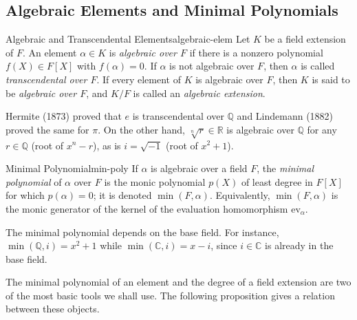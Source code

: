 \subsection{Algebraic Elements and Minimal Polynomials}

\begin{Definition}{Algebraic and Transcendental Elements}{algebraic-elem}
  Let $K$ be a field extension of $F$. 
  An element $\alpha\in K$ is \emph{algebraic over $F$} if there is a nonzero polynomial $f(X)\in F[X]$ with $f(\alpha)=0$. 
  If $\alpha$ is not algebraic over $F$, then $\alpha$ is called \emph{transcendental over $F$}. 
  If every element of $K$ is algebraic over $F$, then $K$ is said to be \emph{algebraic over $F$}, and $K/F$ is called an \emph{algebraic extension}.
\end{Definition}

Hermite (1873) proved that $e$ is transcendental over $\mathbb{Q}$ and Lindemann (1882) proved the same for $\pi$. 
On the other hand, $\sqrt[n]{r}\in\mathbb{R}$ is algebraic over $\mathbb{Q}$ for any $r\in\mathbb{Q}$ (root of $x^n-r$), as is $i=\sqrt{-1}$ (root of $x^2+1$).

\begin{Definition}{Minimal Polynomial}{min-poly}
  If $\alpha$ is algebraic over a field $F$, the \emph{minimal polynomial} of $\alpha$ over $F$ is the monic polynomial $p(X)$ of least degree in $F[X]$ for which $p(\alpha)=0$; it is denoted $\min(F,\alpha)$. 
  Equivalently, $\min(F,\alpha)$ is the monic generator of the kernel of the evaluation homomorphism $\mathrm{ev}_\alpha$.
\end{Definition}

The minimal polynomial depends on the base field. 
For instance, $\min(\mathbb{Q},i)=x^2+1$ while $\min(\mathbb{C},i)=x-i$, since $i\in\mathbb{C}$ is already in the base field.

The minimal polynomial of an element and the degree of a field extension
are two of the most basic tools we shall use. 
The following proposition gives a relation between these objects.

